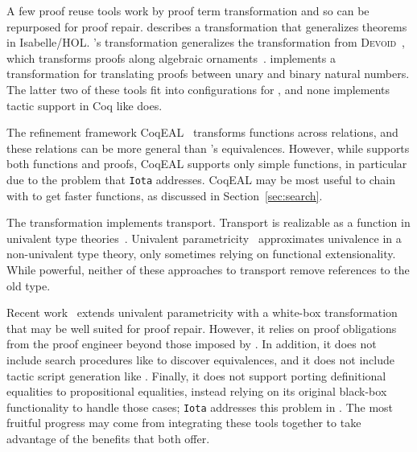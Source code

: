 A few proof reuse tools work by proof term transformation and so can be repurposed for proof repair.
\citet{Johnsen2004} describes a transformation that generalizes theorems in Isabelle/HOL.
\toolname's transformation generalizes the transformation from \textsc{Devoid}~\cite{Ringer2019},
which transforms proofs along algebraic ornaments~\cite{mcbride}.
\citet{magaud2000changing} implements a transformation for translating proofs between
unary and binary natural numbers. 
The latter two of these tools fit into configurations for \toolname,
and none implements tactic support in Coq like \toolname does.

The refinement framework CoqEAL~\cite{cohen:hal-01113453} transforms functions across relations,
and these relations can be more general than \toolname's equivalences.
However, while \toolname supports both functions and proofs, CoqEAL supports only simple functions,
in particular due to the problem that \lstinline{Iota} addresses.
CoqEAL may be most useful to chain with \toolname to get faster functions,
as discussed in Section~\ref{sec:search}.

The \toolname transformation implements transport.
Transport is realizable as a function in univalent type theories~\cite{univalent2013homotopy}.
Univalent parametricity~\cite{tabareau2017equivalences} approximates univalence
in a non-univalent type theory, only sometimes relying on functional extensionality.
While powerful, neither of these approaches to transport remove references to the old type. %

Recent work~\cite{tabareau2019marriage} extends univalent parametricity with 
a white-box transformation that may be well suited for proof repair.
However, it relies on proof obligations from the proof engineer beyond those imposed by \toolname.
In addition, it does not include search procedures like \toolname to discover equivalences,
and it does not include tactic script generation like \toolname.
Finally, it does not support porting definitional equalities to propositional equalities,
instead relying on its original black-box functionality to handle those cases;
\lstinline{Iota} addresses this problem in \toolname. %
The most fruitful progress may come from integrating these tools together to take advantage of the benefits that both offer.

